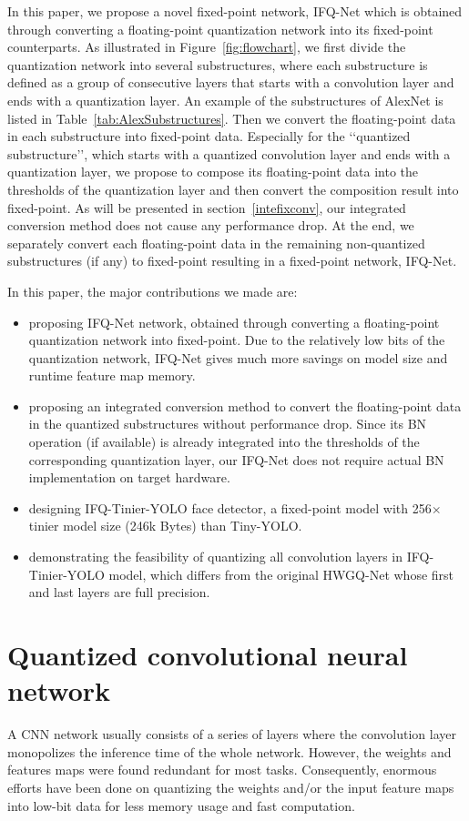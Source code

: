 \documentclass[10pt,twocolumn,letterpaper]{article}
\begin{document}
In this paper,  we propose a novel fixed-point network, IFQ-Net which is obtained through converting a floating-point quantization network into its fixed-point counterparts. As illustrated in Figure~\ref{fig:flowchart}, we first divide the quantization network into several substructures, where each substructure is defined as a group of consecutive layers that starts with a convolution layer and ends with a quantization layer. An example of the substructures of AlexNet is listed in Table~\ref{tab:AlexSubstructures}. Then we convert the floating-point data in each substructure into fixed-point data. Especially for the \lq\lq quantized substructure\rq\rq, which starts with a quantized convolution layer and ends with a quantization layer, we propose to compose its floating-point data into the thresholds of the quantization layer and then convert the composition result into fixed-point. As will be presented in section~\ref{intefixconv}, our integrated conversion method does not cause any performance drop. At the end, we separately convert each floating-point data in the remaining non-quantized substructures (if any) to fixed-point resulting in a fixed-point network, IFQ-Net. 

In this paper, the major contributions we made are:
\begin{itemize}
\item proposing IFQ-Net network, obtained through converting a floating-point quantization network into fixed-point. Due to the relatively low bits of the quantization network, IFQ-Net gives much more savings on model size and runtime feature map memory.\item proposing an integrated conversion method to convert the floating-point data in the quantized substructures without performance drop. Since its BN operation (if available) is already integrated into the thresholds of the corresponding quantization layer, our IFQ-Net does not require actual BN implementation on target hardware. \item designing IFQ-Tinier-YOLO face detector, a fixed-point model with 256$\times$ tinier model size (246k Bytes) than Tiny-YOLO.\item demonstrating the feasibility of quantizing all convolution layers in IFQ-Tinier-YOLO model, which differs from the original HWGQ-Net whose first and last layers are full precision.
\end{itemize}


\section{Quantized convolutional neural network}\label{Sec:QCNN}
A CNN network usually consists of a series of layers where the convolution layer monopolizes the inference time of the whole network. However, the weights and features maps were found redundant for most tasks. Consequently, enormous efforts have been done on quantizing the weights and/or the input feature maps into low-bit data for less memory usage and fast computation. 
\end{document}
